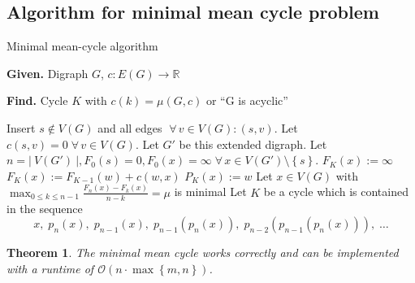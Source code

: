 \documentclass{article}
\newtheorem{theorem}{Theorem}
\newcommand{\card}[1]{\left|\:\!#1\:\!\right|}
\newcommand{\set}[1]{\left\{#1\right\}}
\newcommand{\given}[1]{\textbf{Given.} #1\par}
\newcommand{\find}[1]{\textbf{Find.} #1\par}
\newcommand{\fall}{\;\forall\,}
\begin{document}
\subsection{Algorithm for minimal mean cycle problem}
%
\begin{algorithm}
  \caption{Minimal mean-cycle algorithm}
  \label{mmc-algo}
  \given{Digraph $G$, $c: E(G) \rightarrow \mathbb{R}$}
  \find{Cycle $K$ with $c(k) = \mu(G, c)$ or ``G is acyclic''}
\begin{algorithmic}[1]
  \State Insert $s \notin V(G)$ and all edges $\fall v \in V(G): (s, v)$. Let $c(s, v) = 0 \fall v \in V(G)$. Let $G'$ be this extended digraph.
  \State Let $n = \card{V(G')}, F_0(s) = 0, F_0(x) = \infty \fall x \in V(G') \setminus \set{s}$.
      \State $F_K(x) := \infty$
          \State $F_K(x) := F_{K-1}(w) + c(w, x)$
          \State $P_K(x) := w$
        \EndIf
      \EndFor
    \EndFor
  \EndFor
  \If{$F_n(x) := \infty \fall x \in V(G') \setminus \set{s}$}
    \State {}
  \EndIf
  \State Let $x \in V(G)$ with $\max_{0 \leq k \leq n-1} \frac{F_n(x) - F_k(x)}{n-k} = \mu$ is minimal
  \State Let $K$ be a cycle which is contained in the sequence
    \[
      x,\;p_n(x),\;p_{n-1}(x),\;p_{n-1}(p_n(x)),\;p_{n-2}(p_{n-1}(p_n(x))),\;\ldots
    \]
  \State {}
\end{algorithmic}
\end{algorithm}


\begin{theorem}\label{korollar-3.11}
  The minimal mean cycle works correctly and can be implemented with a runtime of $\mathcal{O}(n \cdot\max\set{m,n})$.
\end{theorem}
\end{document}
